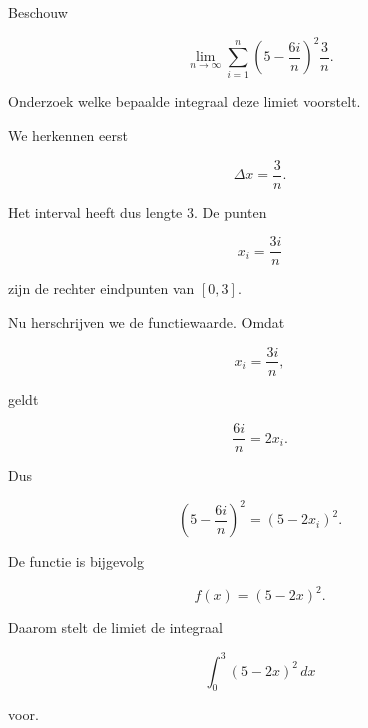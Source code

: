 \documentclass{ximera}
\begin{document}




\begin{oefening}{\oefG}

Beschouw

\[
\lim_{n\to\infty}
\sum_{i=1}^{n}
\left(5-\frac{6i}{n}\right)^2\frac{3}{n}.
\]

Onderzoek welke bepaalde integraal deze limiet voorstelt.

\begin{oplossing}
We herkennen eerst

\[
\Delta x=\frac3n.
\]

Het interval heeft dus lengte \(3\). De punten

\[
x_i=\frac{3i}{n}
\]

zijn de rechter eindpunten van \([0,3]\).

Nu herschrijven we de functiewaarde. Omdat

\[
x_i=\frac{3i}{n},
\]

geldt

\[
\frac{6i}{n}=2x_i.
\]

Dus

\[
\left(5-\frac{6i}{n}\right)^2
=
(5-2x_i)^2.
\]

De functie is bijgevolg

\[
f(x)=(5-2x)^2.
\]

Daarom stelt de limiet de integraal

\[
\boxed{
\int_0^3(5-2x)^2\,dx
}
\]

voor.
\end{oplossing}

\end{oefening}


\end{document}
